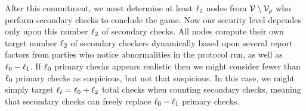 After this commitment, we must determine at least $\ell_2$ nodes from $\mathcal{V} \setminus \mathcal{V}_{\rho}$ who perform secondary checks to conclude the game.  Now our security level dependes only upon this number $\ell_2$ of secondary checks.  
All nodes compute their own target number $\ell_2$ of secondary checkers dynamically based upon several report factors from parties who notice abnormalities in the protocol run, as well as $\ell_0-\ell_1$.  If $\ell_0$ primary checks appears realistic then we might consider fewer than $\ell_0$ primary checks as suspicious, but not that suspicious.  In this case, we might simply target $\ell_t = \ell_0 + \ell_2$ total checks when counting secondary checks, meaning that secondary checks can freely replace $\ell_0-\ell_1$ primary checks.  



